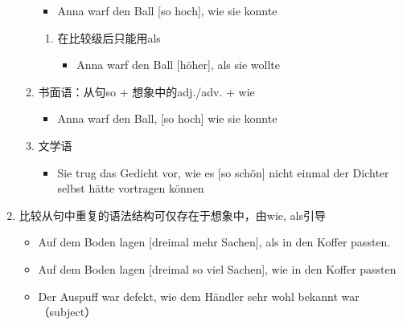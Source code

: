 \documentclass[UTF8]{report}
\begin{document}
\begin{enumerate}
\begin{enumerate}
\begin{itemize}
            \item Anna warf den Ball [so hoch], wie sie konnte
        \end{itemize}
        \begin{enumerate}
            \item 在比较级后只能用als
            \begin{itemize}
                \item Anna warf den Ball [höher], als sie wollte
            \end{itemize}
        \end{enumerate}
        \item 书面语：从句so + 想象中的adj./adv. + wie
        \begin{itemize}
            \item Anna warf den Ball, [so hoch] wie sie konnte
        \end{itemize}
        \item 文学语
        \begin{itemize}
            \item Sie trug das Gedicht vor, wie es [so schön] nicht einmal der Dichter selbst hätte vortragen können
        \end{itemize}
    \end{enumerate}
    \item 比较从句中重复的语法结构可仅存在于想象中，由wie, als引导
    \begin{itemize}
        \item Auf dem Boden lagen [dreimal mehr Sachen], als in den Koffer passten.
        \item Auf dem Boden lagen [dreimal so viel Sachen], wie in den Koffer passten
        \item Der Auspuff war defekt, wie dem Händler sehr wohl bekannt war（subject）
    \end{itemize}
\end{enumerate}
\end{document}
